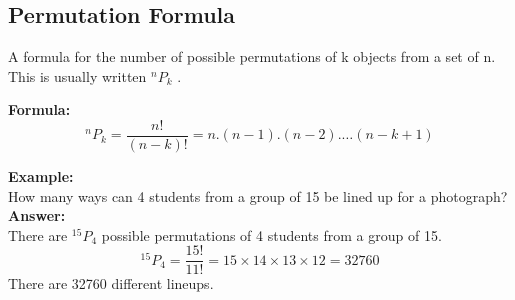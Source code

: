 


\subsection{Permutation Formula}

A formula for the number of possible permutations of k objects from a set of n. This is usually written $^nP_k$ .


\noindent\textbf{Formula:}	
\[ ^nP_k = \frac{n!}{(n-k)!} =  n.(n-1).(n-2).\ldots(n-k+1) \]



\noindent \textbf{Example:}\\	
How many ways can 4 students from a group of 15 be lined up for a photograph?\\

\noindent \textbf{Answer:	}\\
There are $^{15}P_4$ possible permutations of 4 students from a group of 15.
\[ ^{15}P_4 = \frac{15!}{11!} = 15\times 14\times 13\times 12 = 32760 \]
There are 32760 different lineups.







